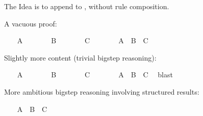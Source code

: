 \begin{isabellebody}
\begin{isamarkuptext}
\begin{itemize}
  \end{itemize}%
\end{isamarkuptext}%
\isamarkuptrue%
%
\isamarkuptrue%
%
\begin{isamarkuptext}%
The Idea is to append  to ,
  without rule composition.%
\end{isamarkuptext}%
\isamarkuptrue%
\isamarkupfalse%
\isanewline
{}%
\isadelimproof
%
\endisadelimproof
%
\isatagproof
%
\begin{isamarkuptxt}%
A vacuous proof:%
\end{isamarkuptxt}%
\isamarkuptrue%
\ \ \isamarkupfalse%
\ A\ \isamarkupfalse%
\isanewline
\ \ \isamarkupfalse%
\isanewline
\ \ \isamarkupfalse%
\ B\ \isamarkupfalse%
\isanewline
\ \ \isamarkupfalse%
\isanewline
\ \ \isamarkupfalse%
\ C\ \isamarkupfalse%
\isanewline
\ \ \isamarkupfalse%
\isanewline
\ \ \isamarkupfalse%
\ A\ \ B\ \ C\ \isamarkupfalse%
\isanewline
{}\isamarkupfalse%
%
\begin{isamarkuptxt}%
Slightly more content (trivial bigstep reasoning):%
\end{isamarkuptxt}%
\isamarkuptrue%
\ \ \isamarkupfalse%
\ A\ \isamarkupfalse%
\isanewline
\ \ \isamarkupfalse%
\isanewline
\ \ \isamarkupfalse%
\ B\ \isamarkupfalse%
\isanewline
\ \ \isamarkupfalse%
\isanewline
\ \ \isamarkupfalse%
\ C\ \isamarkupfalse%
\isanewline
\ \ \isamarkupfalse%
\isanewline
\ \ \isamarkupfalse%
\ {}A\ {}\ B\ {}\ C{}\ \isamarkupfalse%
\ blast\isanewline
{}\isamarkupfalse%
%
\begin{isamarkuptxt}%
More ambitious bigstep reasoning involving structured results:%
\end{isamarkuptxt}%
\isamarkuptrue%
\ \ \isamarkupfalse%
\ {}A\ {}\ B\ {}\ C{}\ \isamarkupfalse%

\end{isabellebody}
